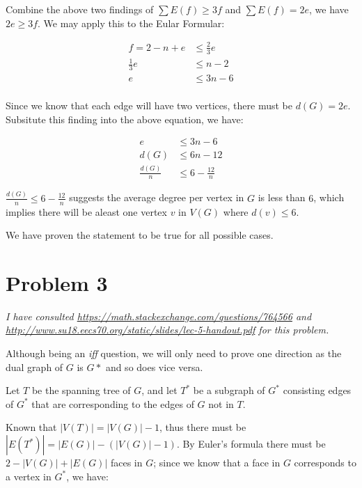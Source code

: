 \documentclass[11pt]{article}
\begin{document}
Combine the above two findings of $\sum E(f) \geq 3f$ and $\sum E(f) = 2e$, we have $2e \geq 3f $. We may apply this to the Eular Formular:

\begin{align*}
    f = 2 - n + e &\leq \frac{2}{3}e \\
    \frac{1}{3}e &\leq n - 2 \\
    e &\leq 3n - 6\\
\end{align*}

Since we know that each edge will have two vertices, there must be $d(G) = 2e$. Subsitute this finding into the above equation, we have:


\begin{align*}
e &\leq 3n - 6\\
d(G) &\leq 6n - 12 \\
\frac{d(G)}{n} &\leq 6 - \frac{12}{n}
\end{align*}

$\frac{d(G)}{n} \leq 6 - \frac{12}{n}$ suggests the average degree per vertex in $G$ is less than $6$, which implies there will be aleast one vertex $v$ in $V(G)$ where $d(v) \leq 6$.\newline

We have proven the statement to be true for all possible cases.




\section*{Problem 3}

\textit{I have consulted \url{https://math.stackexchange.com/questions/764566} and \url{http://www.su18.eecs70.org/static/slides/lec-5-handout.pdf} for this problem.}
\newline

Although being an \textit{iff} question, we will only need to prove one direction as the dual graph of $G$ is $G*$ and so does vice versa.\newline

Let $T$ be the spanning tree of $G$, and let $T^*$ be a subgraph of $G^*$ consisting edges of $G^*$ that are corresponding to the edges of $G$ not in $T$.

Known that $|V(T)| = |V(G)| - 1$, thus there must be $|E(T^*)| = |E(G)| - (|V(G)| - 1)$. By Euler's formula there must be $2 - |V(G)| + |E(G)|$ faces in $G$; since we know that a face in $G$ corresponds to a vertex in $G^*$, we have:
\end{document}

